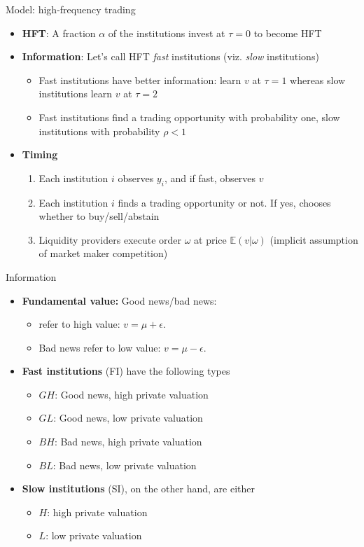 \documentclass[english,10pt
,aspectratio=169
]{beamer}
\begin{document}
\begin{frame}{Model: high-frequency trading}
	\begin{itemize}
		\item \textbf{HFT}: A fraction $\alpha$ of the institutions invest at $\tau =0$ to become HFT
		\item \textbf{Information}: Let's call HFT \textit{fast} institutions (viz. \textit{slow} institutions)
		\begin{itemize}
			\item Fast institutions have better information: learn $v$ at $\tau=1$ whereas slow institutions learn $v$ at $\tau=2$
			\item Fast institutions find a trading opportunity with probability one, slow institutions with probability $\rho<1$
		\end{itemize}
		\item \textbf{Timing}
		\begin{enumerate}
			\item Each institution $i$ observes $y_{i}$, and if fast, observes $v$
			\item Each institution $i$ finds a trading opportunity or not. If yes, chooses whether to buy/sell/abstain
			\item Liquidity providers execute order $\omega$ at price $\mathbb{E}(v|\omega)$
			(implicit assumption of market maker competition)
		\end{enumerate}
	\end{itemize}
\end{frame}


\begin{frame}{Information}
	\begin{itemize}
		\item \textbf{Fundamental value:} Good news/bad news:
		\begin{itemize}
			\item {} refer to high value: $v=\mu+\epsilon$.
			\item \alert{Bad news} refer to low value: $v=\mu-\epsilon$.
		\end{itemize}
		\item \textbf{Fast institutions} (FI) have the following types
		\begin{itemize}
			\item $GH$: Good news, high private valuation
			\item $GL$: Good news, low private valuation
			\item $BH$: Bad news, high private valuation
			\item $BL$: Bad news, low private valuation
		\end{itemize}
		\item \textbf{Slow institutions} (SI), on the other hand, are either
		\begin{itemize}
			\item $H$: high private valuation
			\item $L$: low private valuation
		\end{itemize}
	\end{itemize}
\end{frame}
\end{document}
